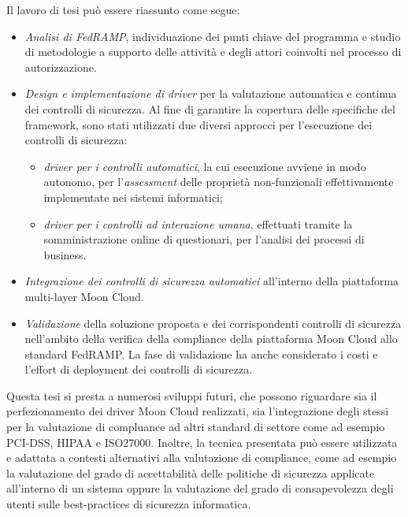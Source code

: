 \documentclass[10pt,a4paper]{article}
\begin{document}
Il lavoro di tesi può essere riassunto come segue:
\begin{itemize}
\item \textit{Analisi di FedRAMP}, individuazione dei punti chiave del programma e studio di metodologie a supporto delle attività e degli attori coinvolti nel processo di autorizzazione.
\item \textit{Design e implementazione di driver} per la valutazione automatica e continua dei controlli di sicurezza.
Al fine di garantire la copertura delle specifiche del framework, sono stati utilizzati due diversi approcci per l'esecuzione dei controlli di sicurezza:
\begin{itemize}
\item \textit{driver per i controlli automatici}, la cui esecuzione avviene in modo autonomo, per l'\textit{assessment} delle proprietà non-funzionali effettivamente implementate nei sistemi informatici;
\item \textit{driver per i controlli ad interazione umana}, effettuati tramite la somministrazione online di questionari, per l'analisi dei processi di business.
\end{itemize}
\item \textit{Integrazione dei controlli di sicurezza automatici} all'interno della piattaforma multi-layer Moon Cloud.
\item \textit{Validazione} della soluzione proposta e dei corrispondenti controlli di sicurezza nell'ambito della verifica della compliance della piattaforma Moon Cloud allo standard FedRAMP. La fase di validazione ha anche considerato i costi e l'effort di deployment dei controlli di sicurezza.
\end{itemize}
Questa tesi si presta a numerosi sviluppi futuri, che possono riguardare sia il perfezionamento dei driver Moon Cloud realizzati, sia l'integrazione degli stessi per la valutazione di compluance ad altri standard di settore come ad esempio PCI-DSS, HIPAA e ISO27000.
Inoltre, la tecnica presentata può essere utilizzata e adattata a contesti alternativi alla valutazione di compliance, come ad esempio la valutazione del grado di accettabilità delle politiche di sicurezza applicate all'interno di un sistema oppure la valutazione del grado di consapevolezza degli utenti sulle best-practices di sicurezza informatica.
\end{document}
